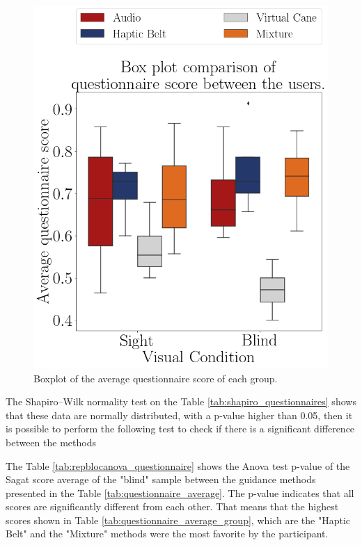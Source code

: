

\begin{figure}[!htb]
    \centering
    \includegraphics[width = 0.5\linewidth]{Resultados/Questionario/Figuras/png/boxplot_questionnaire_scene.png}
    \caption{Boxplot of the average questionnaire score of each group.}
    \label{fig:boxplot_questionnaire_scene}
\end{figure}

The Shapiro–Wilk normality test on the Table \ref{tab:shapiro_questionnaires} shows that these data are normally distributed, with a p-value higher than 0.05, then it is possible to perform the following test to check if there is a significant difference between the methods



The Table \ref{tab:repblocanova_questionnaire} shows the Anova test p-value of the Sagat score average of the "blind" sample between the guidance methods presented in the Table \ref{tab:questionnaire_average}. The p-value indicates that all scores are significantly different from each other. That means that the highest scores shown in Table \ref{tab:questionnaire_average_group}, which are the "Haptic Belt" and the "Mixture" methods were the most favorite by the participant.



\FloatBarrier